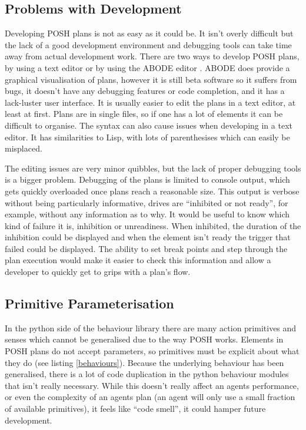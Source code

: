\documentclass[11pt,openright,a4paper]{report}
\begin{document}
\subsection{Problems with Development}
Developing POSH plans is not as easy as it could be. It isn't overly difficult but the lack of a good development environment and debugging tools can take time away from actual development work. There are two ways to develop POSH plans, by using a text editor or by using the ABODE editor \cite{abode}. ABODE does provide a graphical visualisation of plans, however it is still beta software so it suffers from bugs, it doesn't have any debugging features or code completion, and it has a lack-luster user interface. It is usually easier to edit the plans in a text editor, at least at first. Plans are in single files, so if one has a lot of elements it can be difficult to organise.  The syntax can also cause issues when developing in a text editor. It has similarities to Lisp, with lots of parenthesises which can easily be misplaced.

The editing issues are very minor quibbles, but the lack of proper debugging tools is a bigger problem. Debugging of the plans is limited to console output, which gets quickly overloaded once plans reach a reasonable size. This output is verbose without being particularly informative, drives are ``inhibited or not ready'', for example, without any information as to why. It would be useful to know which kind of failure it is, inhibition or unreadiness. When inhibited, the duration of the inhibition could be displayed and when the element isn't ready the trigger that failed could be displayed. The ability to set break points and step through the plan execution would make it easier to check this information and allow a developer to quickly get to grips with a plan's flow.

\subsection{Primitive Parameterisation}
In the python side of the behaviour library there are many action primitives and senses which cannot be generalised due to the way POSH works. Elements in POSH plans do not accept parameters, so primitives must be explicit about what they do (see listing \ref{behaviours}). Because the underlying behaviour has been generalised, there is a lot of code duplication in the python behaviour modules that isn't really necessary. While this doesn't really affect an agents performance, or even the complexity of an agents plan (an agent will only use a small fraction of available primitives), it feels like ``code smell''\cite{Emden02javaquality}, it could hamper future development.
\end{document}
